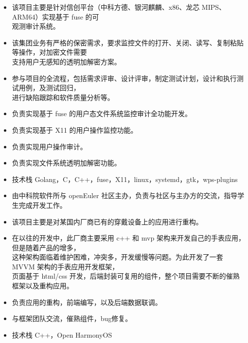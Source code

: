 \documentclass{resume}
\begin{document}
\begin{itemize}
  \item 该项目主要是针对信创平台（中科方德、银河麒麟、x86、龙芯 MIPS、ARM64）实现基于 fuse 的可\\观测审计系统。
  \item 该集团业务有严格的保密需求，要求监控文件的打开、关闭、读写、复制粘贴等操作，对加密文件需要\\支持用户无感知的透明加解密方案。
  \item 参与项目的全流程，包括需求评审、设计评审，制定测试计划，设计和执行测试用例，及测试回归，\\进行缺陷跟踪和软件质量分析等。
  \item 负责实现基于 fuse 的用户态文件系统监控审计全功能开发。
  \item 负责实现基于 X11 的用户操作监控功能。
  \item 负责实现用户操作审计。
  \item 负责实现文件系统透明加解密功能。
  \item 技术栈 Golang，C，C++，fuse，X11，linux，systemd，gtk，wps-plugins
\end{itemize}

\begin{itemize}
  \item 由中科院软件所与 openEuler 社区主办，负责与社区与主办方的交流，指导学生完成开发工作。
\end{itemize}

\begin{itemize}
  \item 该项目主要是对某国内厂商已有的穿戴设备上的应用进行重构。
  \item 在以往的开发中，此厂商主要采用 c++ 和 mvp 架构来开发自己的手表应用，但是随着产品的增多，\\
    这种架构面临着维护困难，冲突多，开发缓慢等问题。为此开发了一套 MVVM 架构的手表应用开发框架，\\
    页面基于 html/css 开发，后端封装可复用的组件，整个项目需要不断的催熟框架以及重构应用。
  \item 负责应用的重构，前端编写，以及后端数据联调。
  \item 与框架团队交流，催熟组件，bug修复。
  \item 技术栈 C++，Open HarmonyOS
\end{itemize}
\end{document}
